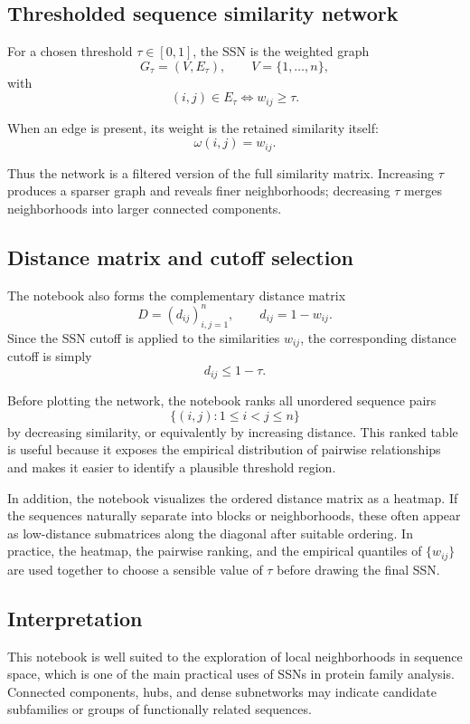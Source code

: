 \documentclass[11pt,a4paper]{article}
\begin{document}
\subsection{Thresholded sequence similarity network}

For a chosen threshold $\tau\in[0,1]$, the SSN is the weighted graph
\[
G_\tau=(V,E_\tau),\qquad V=\{1,\dots,n\},
\]
with
\[
(i,j)\in E_\tau \iff w_{ij}\ge \tau.
\]

When an edge is present, its weight is the retained similarity itself:
\[
\omega(i,j)=w_{ij}.
\]

Thus the network is a filtered version of the full similarity matrix. Increasing $\tau$ produces a sparser graph and reveals finer neighborhoods; decreasing $\tau$ merges neighborhoods into larger connected components.

\subsection{Distance matrix and cutoff selection}

The notebook also forms the complementary distance matrix
\[
D=(d_{ij})_{i,j=1}^n,\qquad d_{ij}=1-w_{ij}.
\]
Since the SSN cutoff is applied to the similarities $w_{ij}$, the corresponding distance cutoff is simply
\[
d_{ij}\le 1-\tau.
\]

Before plotting the network, the notebook ranks all unordered sequence pairs
\[
\{(i,j):1\le i<j\le n\}
\]
by decreasing similarity, or equivalently by increasing distance. This ranked table is useful because it exposes the empirical distribution of pairwise relationships and makes it easier to identify a plausible threshold region.

In addition, the notebook visualizes the ordered distance matrix as a heatmap. If the sequences naturally separate into blocks or neighborhoods, these often appear as low-distance submatrices along the diagonal after suitable ordering. In practice, the heatmap, the pairwise ranking, and the empirical quantiles of $\{w_{ij}\}$ are used together to choose a sensible value of $\tau$ before drawing the final SSN.

\subsection{Interpretation}

This notebook is well suited to the exploration of local neighborhoods in sequence space, which is one of the main practical uses of SSNs in protein family analysis. Connected components, hubs, and dense subnetworks may indicate candidate subfamilies or groups of functionally related sequences.
\end{document}
